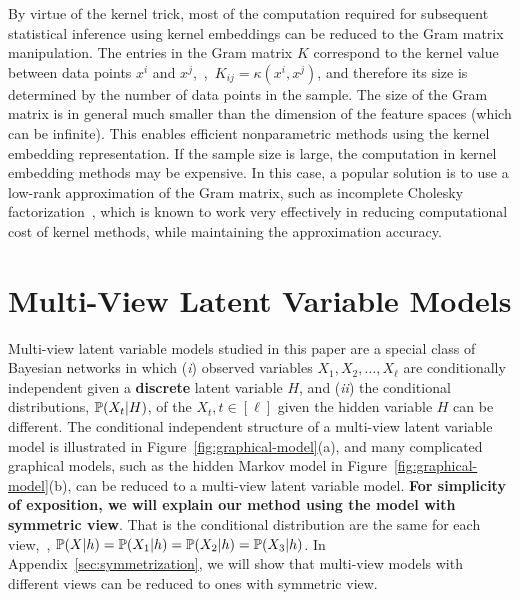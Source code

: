 \documentclass{article}
\begin{document}
By virtue of the kernel trick, most of the computation required for subsequent statistical inference using kernel embeddings can be reduced to the Gram matrix manipulation. The entries in the Gram matrix $K$ correspond to the kernel value between data points $x^i$ and $x^j$,~\ie,~$K_{ij} = \kappa(x^i,x^j)$, and therefore its size is determined by the number of data points in the sample. The size of the Gram matrix is in general much smaller than the dimension of the feature spaces (which can be infinite). This enables efficient nonparametric methods using the kernel embedding representation. If the sample size is large, the computation in kernel embedding methods may be expensive. In this case, a popular solution is to use a low-rank approximation of the Gram matrix, such as incomplete Cholesky factorization~\cite{FinSch01}, which is known to work very effectively in reducing computational cost of kernel methods, while maintaining the approximation accuracy.

\vspace{-3mm}
\section{Multi-View Latent Variable Models}
\vspace{-3mm}

Multi-view latent variable models studied in this paper are a
special class of Bayesian networks in which
({\it i}) observed variables $X_1, X_2, \ldots, X_\ell$ are conditionally independent given a {\bf discrete} latent variable $H$, and
({\it ii}) the conditional distributions, $\mathbb{P}(X_t|H)$, of the $X_t, t \in [\ell]$ given the hidden variable $H$ can be different.
The conditional independent structure of a multi-view latent variable model is illustrated in Figure~\ref{fig:graphical-model}(a), and many complicated graphical models, such as the hidden Markov model in Figure~\ref{fig:graphical-model}(b), can be reduced to a multi-view latent variable model. {\bf For simplicity of exposition, we will explain our method using the model with symmetric view}. That is the conditional distribution are the same for each view,~\ie, $\mathbb{P}(X|h) = \mathbb{P}(X_1|h) =  \mathbb{P}(X_2|h) =\mathbb{P}(X_3|h)$. In Appendix~\ref{sec:symmetrization}, we will show that multi-view models with different views can be reduced to ones with symmetric view.
\end{document}

